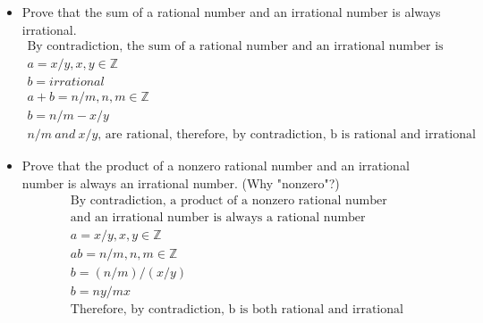 \documentclass[12pt]{article}
\begin{document}
\begin{itemize}
	\item Prove that the sum of a rational number and an irrational number is always irrational.
	    \begin{equation*}
	    	\begin{split}
		    \text{By contradiction, the sum of a rational number and an irrational number is always rational}\\
		    a = x/y, x,y \in \mathbb{Z}\\
		    b = irrational\\
		    a + b = n/m, n, m \in \mathbb{Z}\\
		    b = n/m - x/y\\
		    \text{$n/m\ and\ x/y$, are rational, therefore, by contradiction, b is rational and irrational }
	    	\end{split}
	    \end{equation*}
	\item Prove that the product of a nonzero rational number and an irrational number is always an irrational number. (Why "nonzero"?)
	    \begin{equation*}
	    	\begin{split}
		    \text{By contradiction, a product of a nonzero rational number}\\
		    \text{and an irrational number is always a rational number}\\
		    a = x/y, x, y \in \mathbb{Z}\\
		    ab = n/m, n, m \in \mathbb{Z}\\
		    b = (n/m)/(x/y)\\
		    b = ny/mx\\
		    \text{Therefore, by contradiction, b is both rational and irrational}
	    	\end{split}
	    \end{equation*}
\end{itemize}
\end{document}
